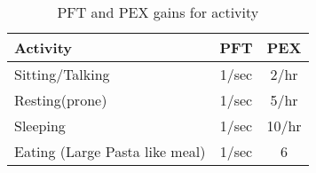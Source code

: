 \begin{table}
	\begin{tabular}{lcc}
	Activity		&	PFT & PEX \\	
\hline
	Sitting/Talking	&	1/sec	& 2/hr \\
	Resting(prone)	&	1/sec	& 5/hr \\
	Sleeping		&	1/sec	& 10/hr \\
	Eating (Large Pasta like meal) 	 & 1/sec & 6 \\
    \end{tabular}
    \caption{PFT and PEX gains for activity}
\end{table}
